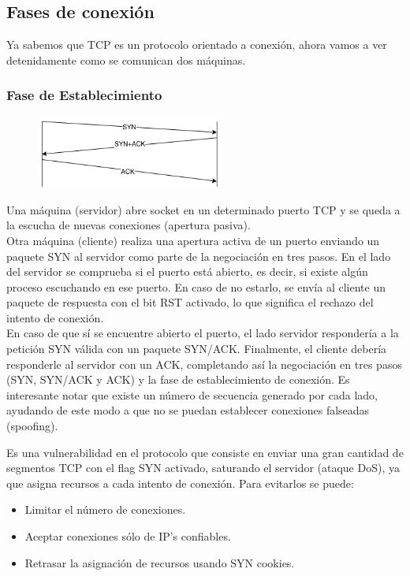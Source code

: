 \subsection{Fases de conexión}
Ya sabemos que TCP es un protocolo orientado a conexión, ahora vamos a ver detenidamente como se comunican dos máquinas.
\subsubsection{Fase de Establecimiento}
\begin{figure}[H]
    \centering
    \includegraphics[width=0.55\textwidth]{img/SYN3.png}
\end{figure}
Una máquina (servidor) abre socket en un determinado puerto TCP y se queda a la escucha de nuevas conexiones (apertura pasiva).\\

Otra máquina (cliente) realiza una apertura activa de un puerto enviando un paquete SYN al servidor como parte de la negociación en tres pasos. En el lado del servidor se comprueba si el puerto está abierto, es decir, si existe algún proceso escuchando en ese puerto. En caso de no estarlo, se envía al cliente un paquete de respuesta con el bit RST activado, lo que significa el rechazo del intento de conexión.\\

En caso de que sí se encuentre abierto el puerto, el lado servidor respondería a la petición SYN válida con un paquete SYN/ACK. Finalmente, el cliente debería responderle al servidor con un ACK, completando así la negociación en tres pasos (SYN, SYN/ACK y ACK) y la fase de establecimiento de conexión. Es interesante notar que existe un número de secuencia generado por cada lado, ayudando de este modo a que no se puedan establecer conexiones falseadas (spoofing).\\


\begin{tcolorbox}[
title=SYN Flood,
colback=blue!5!white,
colframe=blue!75!black,
fonttitle=\bfseries]
Es una vulnerabilidad en el protocolo que consiste en enviar una gran cantidad de segmentos TCP con el flag SYN activado, saturando el servidor (ataque DoS), ya que asigna recursos a cada intento de conexión. Para evitarlos se puede:
\begin{itemize}
    \item Limitar el número de conexiones.
    \item Aceptar conexiones sólo de IP’s confiables.
    \item Retrasar la asignación de recursos usando SYN cookies.
\end{itemize}
\end{tcolorbox}

